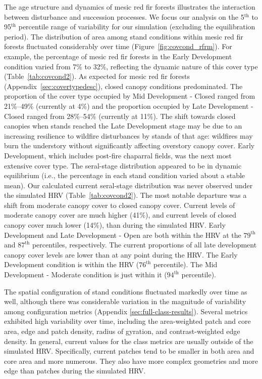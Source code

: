 The age structure and dynamics of mesic red fir forests illustrates the interaction between disturbance and succession processes. We focus our analysis on the 5$^{\text{th}}$ to 95$^{\text{th}}$ percentile range of variability for our simulation (excluding the equilibration period). %
%
The distribution of area among stand conditions within mesic red fir forests fluctuated considerably over time (Figure~\ref{fig:covcond_rfrm}). For example, the percentage of mesic red fir forests in the Early Development condition varied from 7\% to 32\%, reflecting the dynamic nature of this cover type (Table~\ref{tab:covcond2}). As expected for mesic red fir forests (Appendix~\ref{sec:covertypedesc}), closed canopy conditions predominated. The proportion of the cover type occupied by Mid Development - Closed ranged from 21\%--49\% (currently at 4\%) and the proportion occupied by Late Development - Closed ranged from 28\%--54\% (currently at 11\%). The shift towards closed canopies when stands reached the Late Development stage may be due to an increasing resilience to wildfire disturbances by stands of that age: wildfires may burn the understory without significantly affecting overstory canopy cover. Early Development, which includes post-fire chaparral fields, was the next most extensive cover type. %
%
The seral-stage distribution appeared to be in dynamic equilibrium (i.e., the percentage in each stand condition varied about a stable mean). Our calculated current seral-stage distribution was never observed under the simulated HRV (Table~\ref{tab:covcond2}). The most notable departure was a shift from moderate canopy cover to closed canopy cover. Current levels of moderate canopy cover are much higher (41\%), and current levels of closed canopy cover much lower (14\%), than during the simulated HRV. Early Development and Late Development - Open are both within the HRV at the $79^{\text{th}}$ and $87^{\text{th}}$ percentiles, respectively. The current proportions of all late development canopy cover levels are lower than at any point during the HRV.  The Early Development condition is within the HRV ($76^{\text{th}}$ percentile). The Mid Development - Moderate condition is just within it ($94^{\text{th}}$ percentile).

The spatial configuration of stand conditions fluctuated markedly over time as well, although there was considerable variation in the magnitude of variability among configuration metrics (Appendix \ref{sec:full-class-results}). Several metrics exhibited high variability over time, including the area-weighted patch and core area, edge and patch density, radius of gyration, and contrast-weighted edge density. In general, current values for the class metrics are usually outside of the simulated HRV. Specifically, current patches tend to be smaller in both area and core area and more numerous. They also have more complex geometries and more edge than patches during the simulated HRV.


